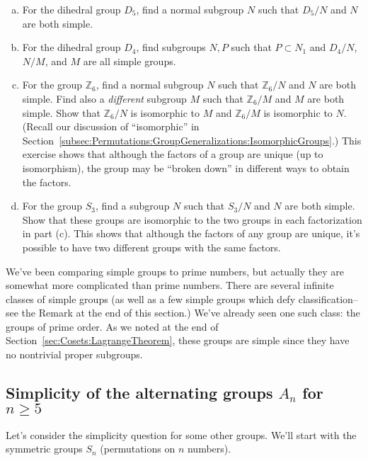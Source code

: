 \begin{exercise}{}
\begin{enumerate}[(a)]
\item
For the dihedral group $D_5$, find a normal subgroup $N$ such that $D_5 / N$ and $N$ are both simple.
\item
For the dihedral group $D_4$, find subgroups $N, P$ such that $P \subset N_1$ and  $D_4/N$, $N/M$, and $M$ are all  simple groups.
\item
For the  group $\mathbb{Z}_6$, find a normal subgroup $N$  such that $\mathbb{Z}_6 / N$ and $N$ are both simple. Find also a \emph{different} subgroup $M$  such that $\mathbb{Z}_6 / M$ and $M$ are both simple. Show that $\mathbb{Z}_6 / N$ is isomorphic to $M$ and $\mathbb{Z}_6 / M$ is isomorphic to $N$.  (Recall our discussion of ``isomorphic'' in Section~\ref{subsec:Permutations:GroupGeneralizations:IsomorphicGroups}.) This exercise shows that although the factors of a group are unique (up to isomorphism), the group may be ``broken down'' in different ways to obtain the factors.
\item
For the  group $S_3$, find a subgroup $N$  such that $S_3 / N$ and $N$ are both simple. Show that these groups are isomorphic to the two groups in each factorization in part (c).  This shows that although the factors of any group are unique, it's possible to have two different groups with the same factors.
\end{enumerate}
\end{exercise}

We've been comparing simple groups to prime numbers, but actually they are somewhat more complicated than prime numbers. There are several infinite classes of simple groups (as well as a few simple groups which defy classification--see the  Remark  at the end of this section.) We've already seen one such  class: the groups of prime order. As we noted at the end of Section~\ref{sec:Cosets:LagrangeTheorem}, these groups are simple since they have
no nontrivial proper subgroups. 


\subsection{Simplicity of the alternating groups $A_n$ for $n \ge 5$}
\label{subsec:Cosets:FactoringSimpleGroups:AlternateGroups}

Let's consider the simplicity question for some other groups. We'll start with the symmetric groups $S_n$ (permutations on $n$ numbers).

